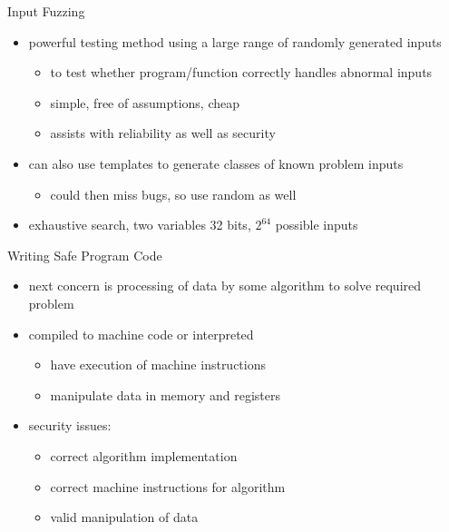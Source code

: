 \documentclass{beamer}
\begin{document}
\begin{frame}{Input Fuzzing}
  \begin{itemize}
  \item powerful testing method using a large range of
randomly generated inputs
  \begin{itemize}
    \item to test whether program/function correctly handles
abnormal inputs
    \item simple, free of assumptions, cheap
    \item assists with reliability as well as security
  \end{itemize}
  \item can also use templates to generate classes of
known problem inputs
  \begin{itemize}
    \item could then miss bugs, so use random as well 
  \end{itemize}
  \item exhaustive search, two variables 32 bits, $2^{64}$ possible inputs
  \end{itemize}
\end{frame}


\begin{frame}{Writing Safe Program Code}
  \begin{itemize}
  \item next concern is processing of data by some
algorithm to solve required problem
  \item compiled to machine code or interpreted
  \begin{itemize}
    \item have execution of machine instructions
    \item manipulate data in memory and registers
  \end{itemize}
  \item security issues:
  \begin{itemize}
    \item correct algorithm implementation
    \item correct machine instructions for algorithm
    \item valid manipulation of data 
  \end{itemize}
  \end{itemize}
\end{frame}
\end{document}
